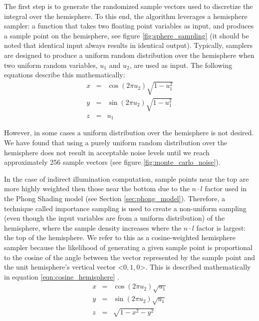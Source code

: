 The first step is to generate the randomized sample vectors used to discretize the integral over the hemisphere. To this end, the algorithm leverages a hemisphere sampler: a function that takes two floating point variables as input, and produces a sample point on the hemisphere, see figure \ref{fig:sphere_sampling} (it should be noted that identical input always results in identical output). Typically, samplers are designed to produce a uniform random distribution over the hemisphere when two uniform random variables, $u_{1}$ and $u_{2}$, are used as input. The following equations \cite{bib:pbr} describe this mathematically:
\begin{eqnarray}
x &=& \cos (2 \pi u_{2}) \sqrt{1-u_{1}^{2}} \nonumber \\
y &=& \sin (2 \pi u_{2}) \sqrt{1-u_{1}^{2}} \nonumber \\
z &=& u_{1}
\label{eqn:uniform_hemisphere}
\end{eqnarray}

However, in some cases a uniform distribution over the hemisphere is not desired. We have found that using a purely uniform random distribution over the hemisphere does not result in acceptable noise levels until we reach approximately 256 sample vectors (see figure \ref{fig:monte_carlo_noise}).

In the case of indirect illumination computation, sample points near the top are more highly weighted then those near the bottom due to the $n \cdot l$ factor used in the Phong Shading model (see Section \ref{sec:phong_model}). Therefore, a technique called importance sampling \cite{bib:pbr} is used to create a non-uniform sampling (even though the input variables are from a uniform distribution) of the hemisphere, where the sample density increases where the $n \cdot l$ factor is largest: the top of the hemisphere. We refer to this as a cosine-weighted hemisphere sampler because the likelihood of generating a given sample point is proportional to the cosine of the angle between the vector represented by the sample point and the unit hemisphere’s vertical vector \textless$0,1,0$\textgreater. This is described mathematically in equation \ref{eqn:cosine_hemisphere} \cite{bib:pbr}.
\begin{eqnarray}
x &=& \cos (2 \pi u_{2}) \sqrt{u_{1}} \nonumber \\
y &=& \sin (2 \pi u_{2}) \sqrt{u_{1}} \nonumber \\
z &=& \sqrt{1-x^{2}-y^{2}}
\label{eqn:cosine_hemisphere}
\end{eqnarray}

